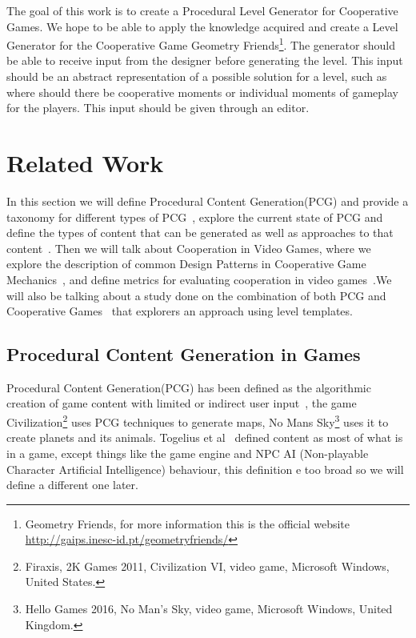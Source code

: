 \documentclass[runningheads]{llncs}
\begin{document}
The goal of this work is to create a Procedural Level Generator for Cooperative Games. We hope to be able to apply the knowledge acquired and create a Level Generator for the Cooperative Game Geometry Friends\footnote{Geometry Friends, for more information this is the official website \href{http://gaips.inesc-id.pt/geometryfriends/}{http://gaips.inesc-id.pt/geometryfriends/}}. The generator should be able to receive input from the designer before generating the level. This input should be an abstract representation of a possible solution for a level, such as where should there be cooperative moments or individual moments of gameplay for the players. This input should be given through an editor.

\section{Related Work}

In this section we will define Procedural Content Generation(PCG) and provide a taxonomy for different types of PCG~\cite{ref_togelius}, explore the current state of PCG and define the types of content that can be generated as well as approaches to that content~\cite{ref_hendrikx}. Then we will talk about Cooperation in Video Games, where we explore the description of common Design Patterns in Cooperative Game Mechanics~\cite{ref_rocha}, and define metrics for evaluating cooperation in video games~\cite{ref_magy}.We will also be talking about a study done on the combination of both PCG and Cooperative Games~\cite{ref_arkel} that explorers an approach using level templates.

\subsection{Procedural Content Generation in Games}

Procedural Content Generation(PCG) has been defined as the algorithmic creation of game content with limited or indirect user input~\cite{ref_togelius}, the game Civilization\footnote{Firaxis, 2K Games 2011, Civilization VI, video game, Microsoft Windows, United States.} uses PCG techniques to generate maps, No Mans Sky\footnote{Hello Games 2016, No Man's Sky, video game, Microsoft Windows, United Kingdom.} uses it to create planets and its animals. Togelius et al~\cite{ref_togelius} defined content as most of what is in a game, except things like the game engine and NPC AI (Non-playable Character Artificial Intelligence) behaviour, this definition e too broad so we will define a different one later. 
\end{document}
